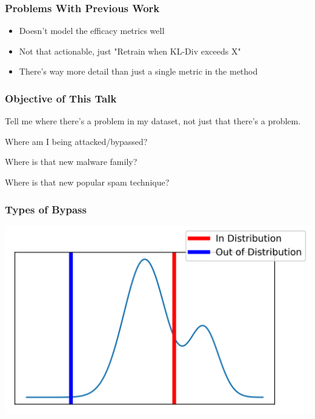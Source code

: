 \documentclass{beamer}
\begin{document}
\begin{frame}
\frametitle{Problems With Previous Work}
\begin{itemize}
\item Doesn't model the efficacy metrics well
\item Not that actionable, just "Retrain when KL-Div exceeds X" 
\item There's way more detail than just a single metric in the method
\end{itemize}
\end{frame}

\begin{frame}
\frametitle{Objective of This Talk}
\begin{center}
Tell me where there's a problem in my dataset, not just that there's a problem.

\vspace{20px}

Where am I being attacked/bypassed? 

Where is that new malware family? 

Where is that new popular spam technique?
\end{center}
\end{frame}

\begin{frame}
\frametitle{Types of Bypass}
\includegraphics[scale=1]{in_vs_out.png}
\end{frame}
\end{document}
